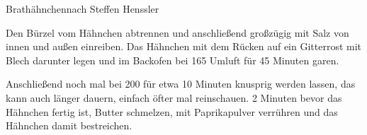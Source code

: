 \begin{recipe}{Brathähnchen}{nach Steffen Henssler}
  \label{Brathähnchen}
  \inglist

  \steps

  Den Bürzel vom Hähnchen abtrennen und anschließend großzügig mit Salz von
  innen und außen einreiben. Das Hähnchen mit dem Rücken auf ein Gitterrost mit
  Blech darunter legen und im Backofen bei 165 \celsius Umluft für 45 Minuten
  garen.
  
  Anschließend noch mal bei 200 \celsius für etwa 10 Minuten knusprig werden
  lassen, das kann auch länger dauern, einfach öfter mal reinschauen. 2 Minuten
  bevor das Hähnchen fertig ist, Butter schmelzen, mit Paprikapulver verrühren
  und das Hähnchen damit bestreichen.
  
\end{recipe}
